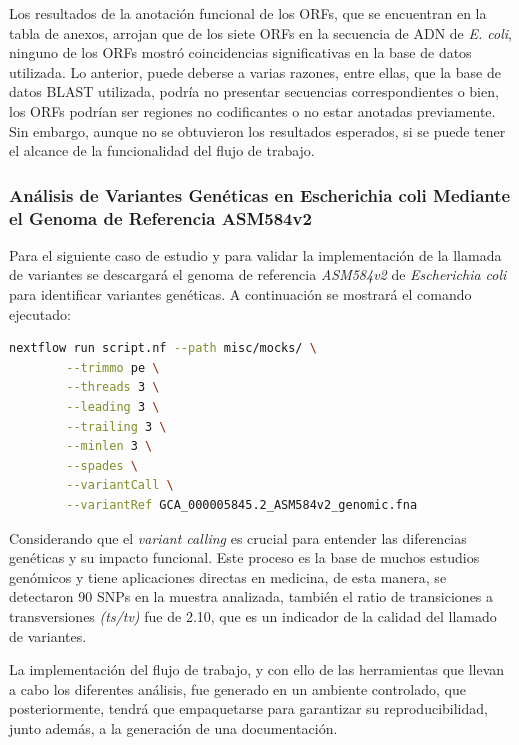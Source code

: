 \documentclass[12pt]{article}
\begin{document}
Los resultados de la anotación funcional de los ORFs, que se encuentran en la 
tabla de anexos, arrojan que de los siete ORFs en la secuencia 
de ADN de \emph{E. coli}, 
ninguno de los ORFs mostró coincidencias significativas en 
la base de datos utilizada. 
Lo anterior, puede deberse a varias razones, entre ellas, que 
la base de datos 
BLAST utilizada, podría no presentar secuencias correspondientes 
o bien, los ORFs 
podrían ser regiones no codificantes o no estar anotadas previamente. 
Sin embargo, 
aunque no se obtuvieron los resultados esperados, si se puede tener el 
alcance de la 
funcionalidad del flujo de trabajo.

\subsubsection*{Análisis de Variantes Genéticas en Escherichia coli Mediante 
el Genoma de Referencia ASM584v2}

Para el siguiente caso de estudio y para validar la implementación de la 
llamada de variantes se descargará el genoma de referencia \emph{ASM584v2} de 
\textit{Escherichia coli} para identificar variantes genéticas. A continuación se mostrará 
el comando ejecutado:

\begin{center}
    \begin{lstlisting}[language=bash, caption=Comando para realizar un llama de variantes en \textit{Escherichia coli} \emph{(elaboración propia)}., label=lst:VARIANTCaso1]
        nextflow run script.nf --path misc/mocks/ \
        --trimmo pe \
        --threads 3 \
        --leading 3 \
        --trailing 3 \
        --minlen 3 \
        --spades \
        --variantCall \
        --variantRef GCA_000005845.2_ASM584v2_genomic.fna 
    \end{lstlisting}
\end{center}

Considerando que el \emph{variant calling} es 
crucial para entender las diferencias genéticas y 
su impacto funcional. Este proceso es la base de
muchos estudios genómicos y tiene aplicaciones 
directas en medicina, de esta manera, se detectaron 
90 SNPs en la muestra analizada, también el ratio 
de transiciones a transversiones \emph{(ts/tv)} 
fue de 2.10, 
que es un indicador de la calidad del llamado de 
variantes. 

La implementación del flujo de trabajo, y con 
ello de las herramientas que llevan a cabo los 
diferentes análisis, fue generado en un ambiente 
controlado, que posteriormente, tendrá que empaquetarse 
para garantizar su reproducibilidad, junto además, 
a la generación de una documentación.
\end{document}

